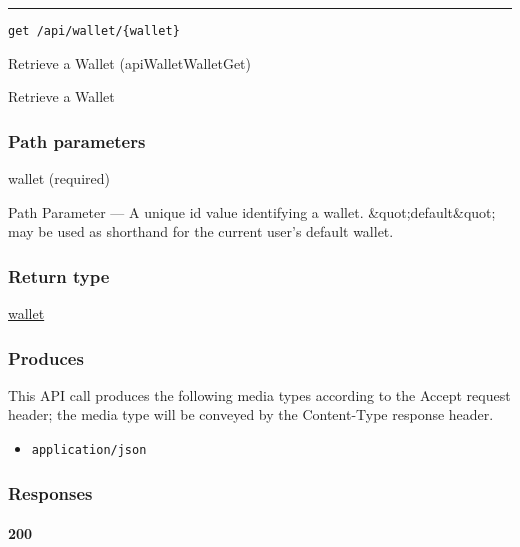 \begin{center}\rule{0.5\linewidth}{\linethickness}\end{center}

\protect\hypertarget{apiWalletWalletGet}{}{}

\begin{verbatim}
get /api/wallet/{wallet}
\end{verbatim}

Retrieve a Wallet ({apiWalletWalletGet})

Retrieve a Wallet

\hypertarget{path-parameters-109}{%
\subsubsection{Path parameters}\label{path-parameters-109}}

wallet (required)

{Path Parameter} --- A unique id value identifying a wallet.
\&quot;default\&quot; may be used as shorthand for the current user's
default wallet.

\hypertarget{return-type-150}{%
\subsubsection{Return type}\label{return-type-150}}

\protect\hyperlink{wallet}{wallet}

\hypertarget{produces-190}{%
\subsubsection{Produces}\label{produces-190}}

This API call produces the following media types according to the
{Accept} request header; the media type will be conveyed by the
{Content-Type} response header.

\begin{itemize}
\tightlist
\item
  \texttt{application/json}
\end{itemize}

\hypertarget{responses-196}{%
\subsubsection{Responses}\label{responses-196}}

\hypertarget{section-630}{%
\paragraph{200}\label{section-630}}


